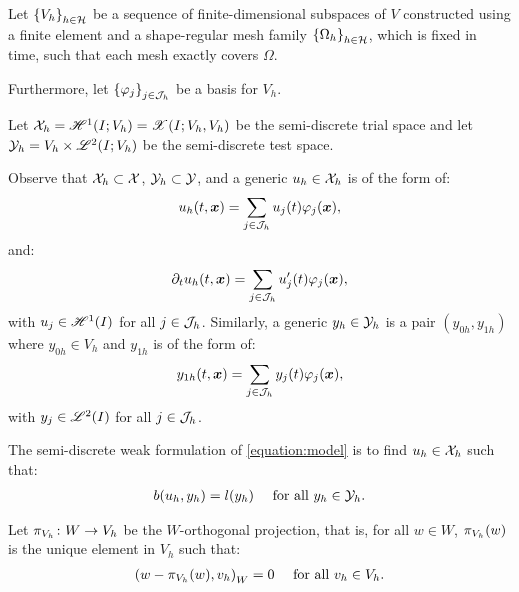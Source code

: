 Let $\left\{ V_h \right\}_{h \in \mathcal{H}}$ be a sequence of finite-dimensional subspaces of $V$ constructed using a finite element and a shape-regular mesh family $\left\{ \Omega_{h} \right\}_{h \in \mathcal{H}}$, which is fixed in time, such that each mesh exactly covers $\Omega$.

Furthermore, let $\left\{ \varphi_j \right\}_{j \in \mathcal{J}_h}$ be a basis for $V_h$.

\begin{definition}
    Let $\mathcal{X}_h = \mathscr{H}^{1}(I; V_h) = \mathscr{X}(I; V_h, V_h)$ be the semi-discrete trial space and let $\mathcal{Y}_h = V_h \times \mathscr{L}^{2}(I; V_h)$ be the semi-discrete test space.
\end{definition}

Observe that $\mathcal{X}_h \subset \mathcal{X}$, $\mathcal{Y}_h \subset \mathcal{Y}$, and a generic $u_h \in \mathcal{X}_h$ is of the form of:
\begin{align}
    u_h(t, \bm{x}) = \sum_{j \in \mathcal{J}_h} u_j(t) \varphi_j(\bm{x}),
\end{align}
and:
\begin{align}
    \partial_t u_h(t, \bm{x}) = \sum_{j \in \mathcal{J}_h} u_j^{\prime}(t) \varphi_j(\bm{x}),
\end{align}
with $u_j \in \mathscr{H}^{1}(I)$ for all $j \in \mathcal{J}_h$. Similarly, a generic $y_h \in \mathcal{Y}_h$ is a pair $(y_{0h}, y_{1h})$ where $y_{0h} \in V_h$ and $y_{1h}$ is of the form of:
\begin{align}
    y_{1h}(t, \bm{x}) = \sum_{j \in \mathcal{J}_h} y_j(t) \varphi_j(\bm{x}),
\end{align}
with $y_j \in \mathscr{L}^{2}(I)$ for all $j \in \mathcal{J}_h$.

\begin{definition}
    The semi-discrete weak formulation of \cref{equation:model} is to find $u_h \in \mathcal{X}_h$ such that:
    \begin{align} \label{equation:weak_h1}
        b(u_h, y_h) &= l(y_h) &\text{ for all } y_h \in \mathcal{Y}_h.
    \end{align}
\end{definition}

\begin{definition}[$\ProjectionOnto{V_h}$]
    Let $\pi_{V_h} \colon W \rightarrow V_h$ be the $W$-orthogonal projection, that is, for all $w \in W$, $\pi_{V_h}(w)$ is the unique element in $V_h$ such that:
    \begin{align}
        \left( w - \pi_{V_h}(w), v_h \right)_W &= 0 &\text{ for all } v_h \in V_h.
    \end{align}
\end{definition}

